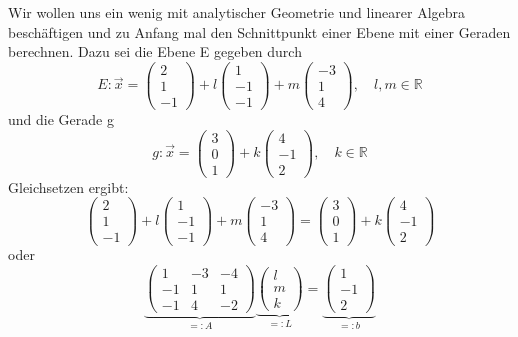 \documentclass[fontsize=12pt,paper=a4,twoside,bibtotoc,idxtotoc,
liststotoc,pagesize,BCOR1.2cm,DIV15,chapterprefix,pagesize=pdftex]{scrbook}
\begin{document}
Wir wollen uns ein wenig mit analytischer Geometrie und linearer Algebra beschäftigen und zu Anfang mal den Schnittpunkt einer Ebene mit einer Geraden 
berechnen. Dazu sei die Ebene E gegeben durch
\[ E: \vec{x}= 
\left ( \begin{array}{c}  2 \\ 1 \\ -1 \end{array} \right) +l 
\left ( \begin{array}{c}  1 \\ -1 \\ -1 \end{array} \right) +m
\left ( \begin{array}{c}  -3 \\ 1 \\ 4 \end{array} \right), \quad l,m
\in \mathbb{R}
\]
und die Gerade g
\[
g: \vec{x}=
\left ( \begin{array}{c}  3 \\ 0 \\ 1 \end{array} \right) +k
\left ( \begin{array}{c}  4 \\ -1 \\ 2 \end{array} \right), \quad k \in \mathbb{R}
\]
Gleichsetzen ergibt: 
\[ 
\left ( \begin{array}{c}  2 \\ 1 \\ -1 \end{array} \right) +l 
\left ( \begin{array}{c}  1 \\ -1 \\ -1 \end{array} \right) +m
\left ( \begin{array}{c}  -3 \\ 1 \\ 4 \end{array} \right) = \left ( \begin{array}{c}  3 \\ 0 \\ 1 \end{array} \right) +k
\left ( \begin{array}{c}  4 \\ -1 \\ 2 \end{array} \right)
\] oder {
\[ 
\underbrace{\left(   
\begin{array} {ccc} 
1 & -3 & -4\\
-1 & 1 & 1 \\
-1 & 4 & -2  
\end{array} \right)}_{\displaystyle =:A} 
\underbrace{\left ( \begin{array}{c}  l \\ m \\ k \end{array}
  \right)}_{\displaystyle =:L} = \underbrace{\left ( \begin{array}{c}  1 \\ -1 \\ 2
  \end{array} \right)}_{\displaystyle =:b}
\] }
\end{document}

